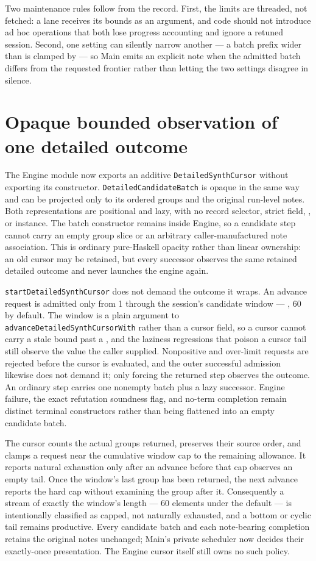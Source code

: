 \documentclass[10pt,letterpaper,oneside]{report}
\newcommand{\code}[1]{\texttt{\detokenize{#1}}}
\begin{document}
Two maintenance rules follow from the record. First, the limits are threaded, not fetched: a lane receives its bounds as an argument, and code should not introduce ad hoc \code{take 5} operations that both lose progress accounting and ignore a retuned session. Second, one setting can silently narrow another --- a batch prefix wider than \code{synth-window} is clamped by \code{admissibleCursorBatch} --- so Main emits an explicit note when the admitted batch differs from the requested frontier rather than letting the two settings disagree in silence.

\section{Opaque bounded observation of one detailed outcome}

The Engine module now exports an additive \nolinkurl{DetailedSynthCursor}
without exporting its constructor. \nolinkurl{DetailedCandidateBatch} is opaque in the same
way and can be projected only to its ordered groups and the original run-level
notes. Both representations are positional and lazy, with no record selector,
strict field, \code{Eq}, or \code{Show} instance. The batch constructor remains
inside Engine, so a candidate step cannot carry an empty group slice or an
arbitrary caller-manufactured note association. This is ordinary pure-Haskell
opacity rather than linear ownership: an old cursor may be retained, but every
successor observes the same retained detailed outcome and never launches the
engine again.

\nolinkurl{startDetailedSynthCursor} does not demand the outcome it wraps. An
advance request is admitted only from 1 through the session's candidate window
--- \code{synth-window}, 60 by default. The window is a plain argument to
\nolinkurl{advanceDetailedSynthCursorWith} rather than a cursor field, so a
cursor cannot carry a stale bound past a \code{:set}, and the laziness
regressions that poison a cursor tail still observe the value the caller
supplied. Nonpositive and over-limit requests are rejected
before the cursor is evaluated, and the outer successful admission likewise
does not demand it; only forcing the returned step observes the outcome. An
ordinary step carries one nonempty batch plus a lazy successor. Engine failure,
the exact refutation soundness flag, and no-term completion remain distinct
terminal constructors rather than being flattened into an empty candidate
batch.

The cursor counts the actual groups returned, preserves their source order,
and clamps a request near the cumulative window cap to the remaining
allowance. It reports natural exhaustion only after an advance before that cap
observes an empty tail. Once the window's last group has been returned, the
next advance reports the hard cap without examining the group after it.
Consequently a stream of exactly the window's length --- 60 elements under the
default --- is intentionally classified as capped, not naturally
exhausted, and a bottom or cyclic tail remains productive. Every candidate
batch and each note-bearing completion retains the original notes unchanged;
Main's private scheduler now decides their exactly-once presentation. The
Engine cursor itself still owns no such policy.
\end{document}
